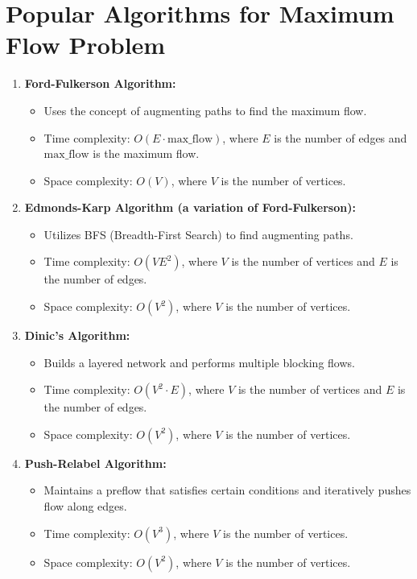 \documentclass{article}
\begin{document}
\pagebreak

\section{Popular Algorithms for Maximum Flow Problem}

\begin{enumerate}
    \item \textbf{Ford-Fulkerson Algorithm:}
    \begin{itemize}
        \item Uses the concept of augmenting paths to find the maximum flow.
        \item Time complexity: $O(E \cdot \text{max\_flow})$, where $E$ is the number of edges and $\text{max\_flow}$ is the maximum flow.
        \item Space complexity: $O(V)$, where $V$ is the number of vertices.
    \end{itemize}

    \item \textbf{Edmonds-Karp Algorithm (a variation of Ford-Fulkerson):}
    \begin{itemize}
        \item Utilizes BFS (Breadth-First Search) to find augmenting paths.
        \item Time complexity: $O(VE^2)$, where $V$ is the number of vertices and $E$ is the number of edges.
        \item Space complexity: $O(V^2)$, where $V$ is the number of vertices.
    \end{itemize}

    \item \textbf{Dinic's Algorithm:}
    \begin{itemize}
        \item Builds a layered network and performs multiple blocking flows.
        \item Time complexity: $O(V^2 \cdot E)$, where $V$ is the number of vertices and $E$ is the number of edges.
        \item Space complexity: $O(V^2)$, where $V$ is the number of vertices.
    \end{itemize}

    \item \textbf{Push-Relabel Algorithm:}
    \begin{itemize}
        \item Maintains a preflow that satisfies certain conditions and iteratively pushes flow along edges.
        \item Time complexity: $O(V^3)$, where $V$ is the number of vertices.
        \item Space complexity: $O(V^2)$, where $V$ is the number of vertices.
    \end{itemize}


\end{enumerate}
\end{document}
